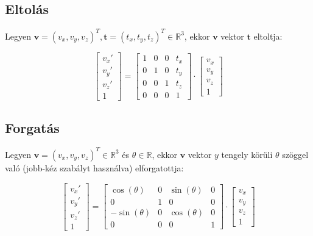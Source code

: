 \subsection{Eltolás}

Legyen $\mathbf{v}=(v_x, v_y, v_z)^T, \mathbf{t}=(t_x, t_y, t_z)^T\in\mathbb{R}^3$, ekkor $\mathbf{v}$ vektor $\mathbf{t}$ eltoltja:

\[\left[\begin{array}{c}v_x' \\v_y'\\ v_z'\\ 1 \end{array}\right] = \left[\begin{array}{cccc}1 & 0 & 0 & t_x\\0 & 1 & 0 & t_y\\ 0 & 0 & 1 & t_z\\ 0 & 0 & 0 & 1\end{array}\right] \cdot \left[\begin{array}{c}v_x \\v_y\\ v_z\\ 1 \end{array}\right]\]

\subsection{Forgatás}

Legyen $\mathbf{v}=(v_x, v_y, v_z)^T\in\mathbb{R}^3$ és $\theta\in\mathbb{R}$, ekkor $\mathbf{v}$ vektor $y$ tengely körüli $\theta$ szöggel való (jobb-kéz szabályt használva) elforgatottja:

\[\left[\begin{array}{c}v_x' \\v_y' \\v_z' \\ 1 \end{array}\right] = \left[\begin{array}{cccc}
\cos (\theta) & 0 & \sin (\theta) & 0\\
0 & 1 & 0 & 0\\
-\sin(\theta) & 0 & \cos(\theta) & 0\\
0 & 0 & 0 & 1\end{array}\right] \cdot \left[\begin{array}{c}v_x\\ v_y\\ v_z\\ 1\end{array}\right]\]

